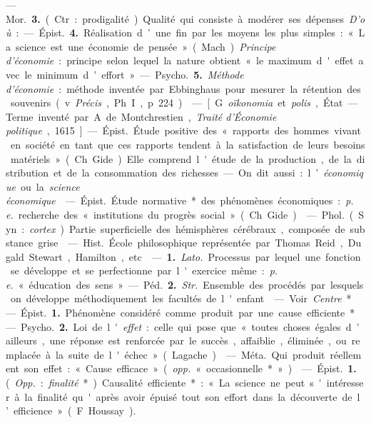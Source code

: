 \begin{itemize}[leftmargin=1cm, label=, itemsep=1pt]
—  \si{Mor.} {\bf 3.} (Ctr. : prodigalité).
Qualité qui consiste à modérer ses
dépenses. {\it D’où} : — \si{Épist.} {\bf 4.} Réalisation d’une fin par les moyens les
plus simples : « La science est une
économie de pensée » (Mach). {\it Principe
d'économie} : principe selon
lequel la nature obtient « le maximum d'effet avec le minimum d’effort ».
— \si{Psycho.} {\bf 5.} {\it Méthode d’économie} : méthode inventée par
Ebbinghaus pour mesurer la rétention des
souvenirs (v.  {\it Précis}, Ph. I, p. 224).

 — [G. {\it oïkonomia} et
{\it polis}, État. — Terme inventé par
A. de Montchrestien, {\it Traité d'Économie politique}, 1615] — \si{Épist.}
Étude positive des « rapports des hommes vivant en société en tant
que ces rapports tendent à la satisfaction de leurs besoins matériels »
(Ch. Gide). Elle comprend l'étude de la production, de la distribution et
de la consommation des richesses. —
On dit aussi : l’{\it économique} ou la {\it science économique}.

 — \si{Épist.} Étude
normative* des phénomènes économiques : {\it p. e.} recherche des
« institutions du progrès social » (Ch. Gide).

 — \si{Phol.} (Syn. : {\it cortex}). Partie
superficielle des hémisphères cérébraux, composée de substance grise.

 — \si{Hist.} École
philosophique représentée par Thomas Reid, Dugald Stewart, Hamilton, etc.

 — {\bf 1.} {\it Lato.} Processus par
lequel une fonction se développe et se perfectionne par l'exercice même :
{\it p. e.} « éducation des sens ».

— \si{Péd.} {\bf 2.} {\it Str.} Ensemble des
procédés par lesquels on développe
méthodiquement les facultés de l'enfant.

 — Voir {\it Centre}*.

 — \si{Épist.} {\bf 1.} Phénomène considéré comme produit par
une cause efficiente*. — \si{Psycho.} {\bf 2.} Loi de
l'{\it effet} : celle qui pose que « toutes
choses égales d’ailleurs, une réponse
est renforcée par le succès, affaiblie,
éliminée, ou remplacée à la suite de l'échec » (Lagache).

 — \si{Méta.} Qui produit réellement son effet : « Cause efficace »
({\it opp.} « occasionnelle* »).

 — \si{Épist.} {\bf 1.} ({\it Opp.} : {\it finalité}*).
Causalité efficiente* : « La
science ne peut s'intéresser à la finalité qu'après avoir épuisé tout son
effort dans la découverte de l’efficience » (F. Houssay).


\end{itemize}

